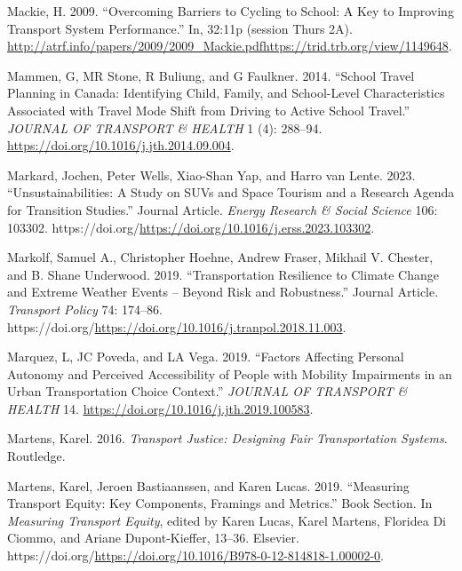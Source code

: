 \documentclass[12pt, oneside]{report}
\newlength{\cslhangindent}
\newlength{\cslentryspacingunit} %
\newenvironment{CSLReferences}[2] %
 {%
  \setlength{\parindent}{0pt}
  \ifodd #1
  \let\oldpar\par
  \def\par{\hangindent=\cslhangindent\oldpar}
  \fi
  \setlength{\parskip}{#2\cslentryspacingunit}
 }%
 {}
\begin{document}
\begin{CSLReferences}{1}{0}
\leavevmode{}%
Mackie, H. 2009. {``Overcoming Barriers to Cycling to School: A Key to
Improving Transport System Performance.''} In, 32:11p (session Thurs
2A).
\url{http://atrf.info/papers/2009/2009_Mackie.pdfhttps://trid.trb.org/view/1149648}.

\leavevmode{}%
Mammen, G, MR Stone, R Buliung, and G Faulkner. 2014. {``School Travel
Planning in {Canada}: {Identifying} Child, Family, and School-Level
Characteristics Associated with Travel Mode Shift from Driving to Active
School Travel.''} \emph{JOURNAL OF TRANSPORT \& HEALTH} 1 (4): 288--94.
\url{https://doi.org/10.1016/j.jth.2014.09.004}.

\leavevmode{}%
Markard, Jochen, Peter Wells, Xiao-Shan Yap, and Harro van Lente. 2023.
{``Unsustainabilities: A Study on SUVs and Space Tourism and a Research
Agenda for Transition Studies.''} Journal Article. \emph{Energy Research
\& Social Science} 106: 103302.
https://doi.org/\url{https://doi.org/10.1016/j.erss.2023.103302}.

\leavevmode{}%
Markolf, Samuel A., Christopher Hoehne, Andrew Fraser, Mikhail V.
Chester, and B. Shane Underwood. 2019. {``Transportation Resilience to
Climate Change and Extreme Weather Events -- Beyond Risk and
Robustness.''} Journal Article. \emph{Transport Policy} 74: 174--86.
https://doi.org/\url{https://doi.org/10.1016/j.tranpol.2018.11.003}.

\leavevmode{}%
Marquez, L, JC Poveda, and LA Vega. 2019. {``Factors Affecting Personal
Autonomy and Perceived Accessibility of People with Mobility Impairments
in an Urban Transportation Choice Context.''} \emph{JOURNAL OF TRANSPORT
\& HEALTH} 14. \url{https://doi.org/10.1016/j.jth.2019.100583}.

\leavevmode{}%
Martens, Karel. 2016. \emph{Transport Justice: Designing Fair
Transportation Systems}. Routledge.

\leavevmode{}%
Martens, Karel, Jeroen Bastiaanssen, and Karen Lucas. 2019. {``Measuring
Transport Equity: Key Components, Framings and Metrics.''} Book Section.
In \emph{Measuring Transport Equity}, edited by Karen Lucas, Karel
Martens, Floridea Di Ciommo, and Ariane Dupont-Kieffer, 13--36.
Elsevier.
https://doi.org/\url{https://doi.org/10.1016/B978-0-12-814818-1.00002-0}.


\end{CSLReferences}
\end{document}
